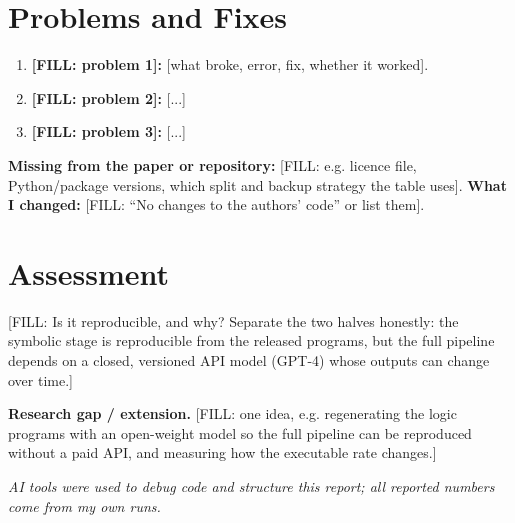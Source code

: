 \documentclass[conference]{IEEEtran}
\begin{document}
\section{Problems and Fixes}
\begin{enumerate}
  \item \textbf{[FILL: problem 1]:} [what broke, error, fix, whether it worked].
  \item \textbf{[FILL: problem 2]:} [...]
  \item \textbf{[FILL: problem 3]:} [...]
\end{enumerate}
\textbf{Missing from the paper or repository:} [FILL: e.g. licence file,
Python/package versions, which split and backup strategy the table uses].
\textbf{What I changed:} [FILL: ``No changes to the authors' code''
or list them].

\section{Assessment}
[FILL: Is it reproducible, and why? Separate the two halves honestly: the
symbolic stage is reproducible from the released programs, but the full
pipeline depends on a closed, versioned API model (GPT-4) whose outputs can
change over time.]

\textbf{Research gap / extension.} [FILL: one idea, e.g. regenerating the
logic programs with an open-weight model so the full pipeline can be
reproduced without a paid API, and measuring how the executable rate changes.]




\vspace{4pt}
\noindent\textit{AI tools were used to debug code and structure this report; all reported numbers come from my own runs.}
\end{document}
